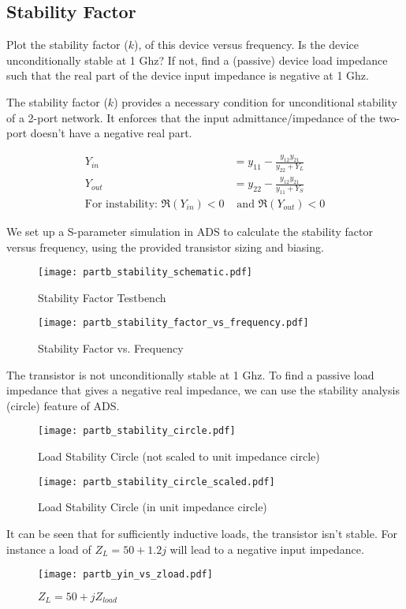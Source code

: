 \subsection{Stability Factor}
{\color{blue}Plot the stability factor ($k$), of this device versus frequency.
Is the device unconditionally stable at 1 Ghz?
If not, find a (passive) device load impedance such that the real part of the device
input impedance is negative at 1 Ghz.}

The stability factor ($k$) provides a necessary condition for unconditional stability of a 2-port network. It enforces that the input admittance/impedance of the two-port doesn't have a negative real part.

\begin{align*}
    Y_{in} &= y_{11} - \frac{y_{12}y_{21}}{y_{22} + Y_L} \\
    Y_{out} &= y_{22} - \frac{y_{12}y_{21}}{y_{11} + Y_S} \\
    \text{For instability: } \Re({Y_{in}}) < 0 &\text{ and } \Re(Y_{out}) < 0
\end{align*}

We set up a S-parameter simulation in ADS to calculate the stability factor versus frequency, using the provided transistor sizing and biasing.

\begin{figure}[H]
    \texttt{[image: partb\_stability\_schematic.pdf]}
    \caption{Stability Factor Testbench}
    \endminipage\hfill
    \texttt{[image: partb\_stability\_factor\_vs\_frequency.pdf]}
    \caption{Stability Factor vs. Frequency}
    \endminipage
\end{figure}

The transistor is not unconditionally stable at 1 Ghz. To find a passive load impedance that gives a negative real impedance, we can use the stability analysis (circle) feature of ADS.

\begin{figure}[H]
    \texttt{[image: partb\_stability\_circle.pdf]}
    \caption{Load Stability Circle (not scaled to unit impedance circle)}
    \endminipage\hfill
    \texttt{[image: partb\_stability\_circle\_scaled.pdf]}
    \caption{Load Stability Circle (in unit impedance circle)}
    \endminipage
\end{figure}

It can be seen that for sufficiently inductive loads, the transistor isn't stable. For instance a load of $Z_L = 50 + 1.2j$ will lead to a negative input impedance.
\begin{figure}[H]
    \centering \texttt{[image: partb\_yin\_vs\_zload.pdf]}
    \caption{$Z_L = 50 + j Z_{load}$}
\end{figure}

